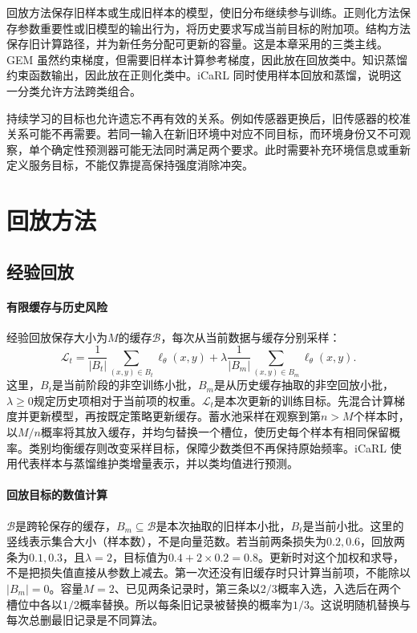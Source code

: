 回放方法保存旧样本或生成旧样本的模型，使旧分布继续参与训练。正则化方法保存参数重要性或旧模型的输出行为，将历史要求写成当前目标的附加项。结构方法保存旧计算路径，并为新任务分配可更新的容量。这是本章采用的三类主线\cite{sayed2025energycl}。GEM 虽然约束梯度，但需要旧样本计算参考梯度，因此放在回放类中。知识蒸馏约束函数输出，因此放在正则化类中。iCaRL 同时使用样本回放和蒸馏，说明这一分类允许方法跨类组合。

持续学习的目标也允许遗忘不再有效的关系。例如传感器更换后，旧传感器的校准关系可能不再需要。若同一输入在新旧环境中对应不同目标，而环境身份又不可观察，单个确定性预测器可能无法同时满足两个要求。此时需要补充环境信息或重新定义服务目标，不能仅靠提高保持强度消除冲突。

\section{回放方法}
\subsection{经验回放}
\paragraph{有限缓存与历史风险}
经验回放保存大小为$M$的缓存$\mathcal B$，每次从当前数据与缓存分别采样：
\begin{equation}
 \mathcal L_t=\frac1{|B_t|}\sum_{(x,y)\in B_t}\ell_\theta(x,y)
 +\lambda\frac1{|B_m|}\sum_{(x,y)\in B_m}\ell_\theta(x,y).\label{eq:continual-replay-objective}
\end{equation}
这里，$B_t$是当前阶段的非空训练小批，$B_m$是从历史缓存抽取的非空回放小批，$\lambda\geq0$规定历史项相对于当前项的权重。$\mathcal L_t$是本次更新的训练目标。先混合计算梯度并更新模型，再按既定策略更新缓存。蓄水池采样在观察到第$n>M$个样本时，以$M/n$概率将其放入缓存，并均匀替换一个槽位，使历史每个样本有相同保留概率。类别均衡缓存则改变采样目标，保障少数类但不再保持原始频率。iCaRL 使用代表样本与蒸馏维护类增量表示，并以类均值进行预测\cite{rebuffi2017icarl}。

\paragraph{回放目标的数值计算}
$\mathcal B$是跨轮保存的缓存，$B_m\subseteq\mathcal B$是本次抽取的旧样本小批，$B_t$是当前小批。这里的竖线表示集合大小（样本数），不是向量范数。若当前两条损失为$0.2,0.6$，回放两条为$0.1,0.3$，且$\lambda=2$，目标值为$0.4+2\times0.2=0.8$。更新时对这个加权和求导，不是把损失值直接从参数上减去。第一次还没有旧缓存时只计算当前项，不能除以$|B_m|=0$。容量$M=2$、已见两条记录时，第三条以$2/3$概率入选，入选后在两个槽位中各以$1/2$概率替换。所以每条旧记录被替换的概率为$1/3$。这说明随机替换与每次总删最旧记录是不同算法。

